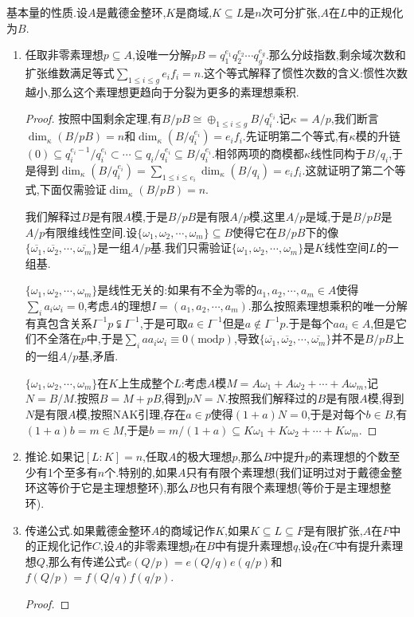 基本量的性质.设$A$是戴德金整环,$K$是商域,$K\subseteq L$是$n$次可分扩张,$A$在$L$中的正规化为$B$.
\begin{enumerate}
	\item 任取非零素理想$p\subseteq A$,设唯一分解$pB=q_1^{e_1}q_2^{e_2}\cdots q_g^{e_g}$.那么分歧指数,剩余域次数和扩张维数满足等式$\sum_{1\le i\le g}e_if_i=n$.这个等式解释了惯性次数的含义:惯性次数越小,那么这个素理想更趋向于分裂为更多的素理想乘积.
	\begin{proof}
		
		按照中国剩余定理,有$B/pB\cong\oplus_{1\le i\le g}B/q_i^{e_i}$.记$\kappa=A/p$,我们断言$\dim_{\kappa}(B/pB)=n$和$\dim_{\kappa}(B/q_i^{e_i})=e_if_i$.先证明第二个等式,有$\kappa$模的升链$(0)\subseteq q_i^{e_i-1}/q_i^{e_i}\subset\cdots\subseteq q_i/q_i^{e_i}\subseteq B/q_i^{e_i}$.相邻两项的商模都$\kappa$线性同构于$B/q_i$,于是得到$\dim_{\kappa}(B/q_i^{e_i})=\sum_{1\le i\le e_i}\dim_{\kappa}(B/q_i)=e_if_i$.这就证明了第二个等式,下面仅需验证$\dim_{\kappa}(B/pB)=n$.
		
		我们解释过$B$是有限$A$模,于是$B/pB$是有限$A/p$模,这里$A/p$是域,于是$B/pB$是$A/p$有限维线性空间.设$\{\omega_1,\omega_2,\cdots,\omega_m\}\subseteq B$使得它在$B/pB$下的像$\{\overline{\omega_1},\overline{\omega_2},\cdots,\overline{\omega_m}\}$是一组$A/p$基.我们只需验证$\{\omega_1,\omega_2,\cdots,\omega_m\}$是$K$线性空间$L$的一组基.
		
		$\{\omega_1,\omega_2,\cdots,\omega_m\}$是线性无关的:如果有不全为零的$a_1,a_2,\cdots,a_m\in A$使得$\sum_ia_i\omega_i=0$,考虑$A$的理想$I=(a_1,a_2,\cdots,a_m)$.那么按照素理想乘积的唯一分解有真包含关系$I^{-1}p\subsetneqq I^{-1}$,于是可取$a\in I^{-1}$但是$a\not\in I^{-1}p$.于是每个$aa_i\in A$,但是它们不全落在$p$中,于是$\sum_iaa_i\omega_i\equiv0(\mathrm{mod}p)$,导致$\{\overline{\omega_1},\overline{\omega_2},\cdots,\overline{\omega_m}\}$并不是$B/pB$上的一组$A/p$基,矛盾.
		
		$\{\omega_1,\omega_2,\cdots,\omega_m\}$在$K$上生成整个$L$:考虑$A$模$M=A\omega_1+A\omega_2+\cdots+A\omega_m$,记$N=B/M$.按照$B=M+pB$,得到$pN=N$.按照我们解释过的$B$是有限$A$模,得到$N$是有限$A$模,按照NAK引理,存在$a\in p$使得$(1+a)N=0$,于是对每个$b\in B$,有$(1+a)b=m\in M$,于是$b=m/(1+a)\subseteq K\omega_1+K\omega_2+\cdots+K\omega_m$.
	\end{proof}
	\item 推论.如果记$[L:K]=n$,任取$A$的极大理想$p$,那么$B$中提升$p$的素理想的个数至少有1个至多有$n$个.特别的,如果$A$只有有限个素理想(我们证明过对于戴德金整环这等价于它是主理想整环),那么$B$也只有有限个素理想(等价于是主理想整环).
	\item 传递公式.如果戴德金整环$A$的商域记作$K$,如果$K\subseteq L\subseteq F$是有限扩张,$A$在$F$中的正规化记作$C$,设$A$的非零素理想$p$在$B$中有提升素理想$q$,设$q$在$C$中有提升素理想$Q$,那么有传递公式$e(Q/p)=e(Q/q)e(q/p)$和$f(Q/p)=f(Q/q)f(q/p)$.
	\begin{proof}
		

\end{proof}
\end{enumerate}

